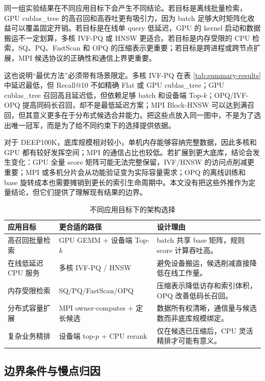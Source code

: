 \documentclass[a4paper,11pt,UTF8]{ctexart}
\begin{document}
同一组实验结果在不同应用目标下会产生不同结论。若目标是离线批量检索，GPU cublas\_tree 的高召回和高吞吐更有吸引力，因为 batch 足够大时矩阵化收益可以覆盖固定开销。若目标是在线单 query 低延迟，GPU 的 kernel 启动和数据搬运不一定划算，多核 IVF-PQ 或 HNSW 更适合。若目标是内存受限的 CPU 检索，SQ、PQ、FastScan 和 OPQ 的压缩表示更重要；若目标是跨进程或跨节点扩展，MPI 候选协议的正确性和通信上界更重要。

这也说明“最优方法”必须带有场景限定。多核 IVF-PQ 在表 \ref{tab:summary-results} 中延迟最低，但 Recall@10 不如精确 Flat 或 GPU cublas\_tree；GPU cublas\_tree 召回高且延迟低，但依赖足够 batch 和设备端 Top-$k$；OPQ/IVF-OPQ 提高同码长召回，却不是最低延迟方案；MPI Block-HNSW 可以达到满召回，但其意义更多在于分布式候选合并能力。把这些点放入同一图中，不是为了选出唯一冠军，而是为了给不同约束下的选择提供依据。

对于 DEEP100K，底库规模相对较小，单机内存能够容纳完整数据，因此多核和 GPU 都有较好发挥空间；MPI 的通信占比也较低。若扩展到更大底库，结论会发生变化：GPU 全量 score 矩阵可能无法完整保留，IVF/HNSW 的访问点削减更重要；MPI 或多机分片会从功能验证变为实际容量需求；OPQ 的离线训练和 base 旋转成本也需要摊销到更长的索引生命周期中。本文没有把这些外推作为定量结论，但它们提供了理解现有结果的边界。

\begin{table}[H]
  \centering\footnotesize
  \begin{tabularx}{\textwidth}{p{3.0cm}p{3.4cm}Y}
    \toprule
    应用目标 & 更合适的路径 & 设计理由 \\
    \midrule
    高召回批量检索 & GPU GEMM + 设备端 Top-$k$ & batch 共享 base 矩阵，规则 score 计算吞吐高。 \\
    在线低延迟 CPU 服务 & 多核 IVF-PQ / HNSW & 避免设备搬运，候选削减直接降低在线工作量。 \\
    内存受限检索 & SQ/PQ/FastScan/OPQ & 压缩表示降低访存和索引体积，OPQ 改善低码长召回。 \\
    分布式容量扩展 & MPI owner-computes + 定长候选 & 数据所有权清晰，通信量与候选数而非底库规模绑定。 \\
    复杂业务精排 & 设备端 top-$p$ + CPU rerank & 仅在候选已压缩后，CPU 灵活精排才可能有意义。 \\
    \bottomrule
  \end{tabularx}
  \caption{不同应用目标下的架构选择}
  \label{tab:scenario-choice}
\end{table}

\subsection{边界条件与慢点归因}
\end{document}
